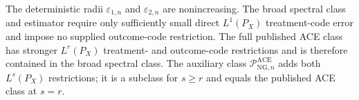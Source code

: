The deterministic radii \(\varepsilon_{1,n}\) and \(\varepsilon_{2,n}\) are nonincreasing.  The broad spectral class and estimator require only sufficiently small direct \(L^1(P_X)\) treatment-code error and impose no supplied outcome-code restriction.  The full published ACE class has stronger \(L^r(P_X)\) treatment- and outcome-code restrictions and is therefore contained in the broad spectral class.  The auxiliary class \(\mathcal P_{\mathrm{NG},n}^{\mathrm{ACE}}\) adds both \(L^s(P_X)\) restrictions; it is a subclass for \(s\ge r\) and equals the published ACE class at \(s=r\).